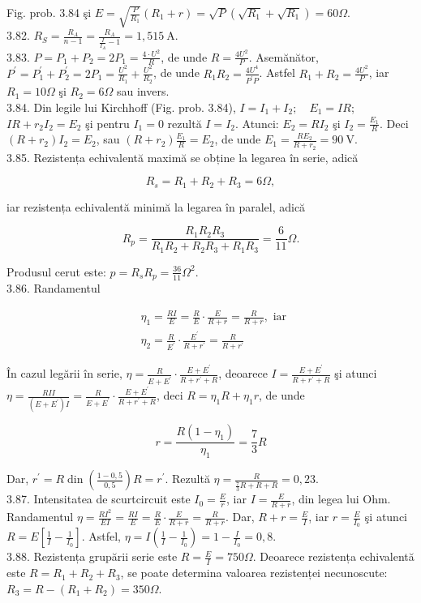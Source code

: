 \documentclass[10pt]{article}
\begin{document}
Fig. prob. 3.84 şi $E=\sqrt{\frac{P}{R_{1}}}\left(R_{1}+r\right)=\sqrt{P}\left(\sqrt{R_{1}}+\sqrt{R_{1}}\right)=60 \Omega$.\\
3.82. $R_{S}=\frac{R_{A}}{n-1}=\frac{R_{A}}{\frac{I}{I_{A}}-1}=1,515 \mathrm{~A}$.\\
3.83. $P=P_{1}+P_{2}=2 P_{1}=\frac{4 \cdot U^{2}}{R}$, de unde $R=\frac{4 U^{2}}{P}$. Asemănător, $P^{\prime}=P_{1}^{\prime}+P_{2}^{\prime}=2 P_{1}=\frac{U^{2}}{R_{1}}+\frac{U^{2}}{R_{2}}$, de unde $R_{1} R_{2}=\frac{4 U^{4}}{P^{\prime} P}$. Astfel $R_{1}+R_{2}=\frac{4 U^{2}}{P}$, iar $R_{1}=10 \Omega$ şi $R_{2}=6 \Omega$ sau invers.\\
3.84. Din legile lui Kirchhoff (Fig. prob. 3.84), $I=I_{1}+I_{2} ; \quad E_{1}=I R$; $I R+r_{2} I_{2}=E_{2}$ şi pentru $I_{1}=0$ rezultă $I=I_{2}$. Atunci: $E_{2}=R I_{2}$ şi $I_{2}=\frac{E_{1}}{R}$. Deci $\left(R+r_{2}\right) I_{2}=E_{2}$, sau $\left(R+r_{2}\right) \frac{E_{1}}{R}=E_{2}$, de unde $E_{1}=\frac{R E_{2}}{R+r_{2}}=90 \mathrm{~V}$.\\
3.85. Rezistența echivalentă maximă se obține la legarea în serie, adică

$$
R_{s}=R_{1}+R_{2}+R_{3}=6 \Omega,
$$

iar rezistența echivalentă minimă la legarea în paralel, adică

$$
R_{p}=\frac{R_{1} R_{2} R_{3}}{R_{1} R_{2}+R_{2} R_{3}+R_{1} R_{3}}=\frac{6}{11} \Omega .
$$

Produsul cerut este: $p=R_{s} R_{p}=\frac{36}{11} \Omega^{2}$.\\
3.86. Randamentul

$$
\begin{aligned}
& \eta_{1}=\frac{R I}{E}=\frac{R}{E} \cdot \frac{E}{R+r}=\frac{R}{R+r}, \text { iar } \\
& \eta_{2}=\frac{R}{E^{\prime}} \cdot \frac{E^{\prime}}{R+r^{\prime}}=\frac{R}{R+r^{\prime}}
\end{aligned}
$$

În cazul legării în serie, $\eta=\frac{R}{E+E^{\prime}} \cdot \frac{E+E^{\prime}}{R+r^{\prime}+R}$, deoarece $I=\frac{E+E^{\prime}}{R+r^{\prime}+R}$ şi atunci $\eta=\frac{R I I}{\left(E+E^{\prime}\right) I}=\frac{R}{E+E^{\prime}} \cdot \frac{E+E^{\prime}}{R+r^{\prime}+R}$, deci $R=\eta_{1} R+\eta_{1} r$, de unde

$$
r=\frac{R\left(1-\eta_{1}\right)}{\eta_{1}}=\frac{7}{3} R
$$

Dar, $r^{\prime}=R \operatorname{din}\left(\frac{1-0,5}{0,5}\right) R=r^{\prime}$. Rezultă $\eta=\frac{R}{\frac{7}{3} R+R+R}=0,23$.\\
3.87. Intensitatea de scurtcircuit este $I_{0}=\frac{E}{r}$, iar $I=\frac{E}{R+r}$, din legea lui Ohm. Randamentul $\eta=\frac{R I^{2}}{E I}=\frac{R I}{E}=\frac{R}{E} \cdot \frac{E}{R+r}=\frac{R}{R+r}$. Dar, $R+r=\frac{E}{I}$, iar $r=\frac{E}{I_{0}}$ şi atunci $R=E\left[\frac{1}{I}-\frac{1}{I_{0}}\right]$. Astfel, $\eta=I\left(\frac{1}{I}-\frac{1}{I_{0}}\right)=1-\frac{I}{I_{0}}=0,8$.\\
3.88. Rezistența grupării serie este $R=\frac{E}{I}=750 \Omega$. Deoarece rezistența echivalentă este $R=R_{1}+R_{2}+R_{3}$, se poate determina valoarea rezistenței necunoscute: $R_{3}=R-\left(R_{1}+R_{2}\right)=350 \Omega$.
\end{document}
